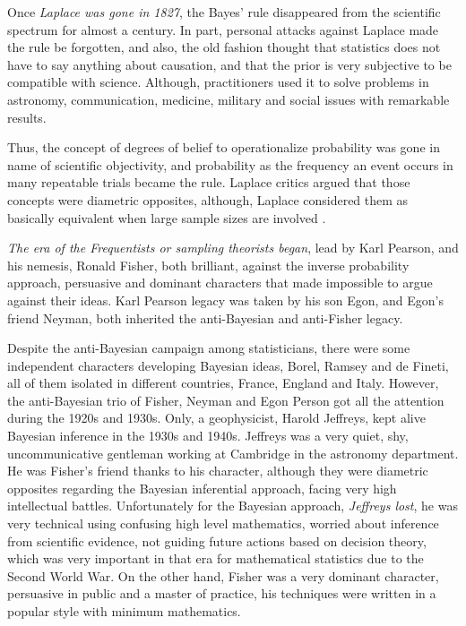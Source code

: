 Once \textit{Laplace was gone in 1827}, the Bayes' rule disappeared from the scientific spectrum for almost a century. In part, personal attacks against Laplace made the rule be forgotten, and also, the old fashion thought that statistics does not have to say anything about causation, and that the prior is very subjective to be compatible with science. Although, practitioners used it to solve problems in astronomy, communication, medicine, military and social issues with remarkable results.

Thus, the concept of degrees of belief to operationalize probability was gone in name of scientific objectivity, and probability as the frequency an event occurs in many repeatable trials became the rule. Laplace critics argued that those concepts were diametric opposites, although, Laplace considered them as basically equivalent when large sample sizes are involved \cite{mcgrayne2011theory}.

\textit{The era of the Frequentists or sampling theorists began}, lead by Karl Pearson, and his nemesis, Ronald Fisher, both brilliant, against the inverse probability approach, persuasive and dominant characters that made impossible to argue against their ideas. Karl Pearson legacy was taken by his son Egon, and Egon's friend Neyman, both inherited the anti-Bayesian and anti-Fisher legacy.  

Despite the anti-Bayesian campaign among statisticians, there were some independent characters developing Bayesian ideas, Borel, Ramsey and de Fineti, all of them isolated in different countries, France, England and Italy. However, the anti-Bayesian trio of Fisher, Neyman and Egon Person got all the attention during the 1920s and 1930s. Only, a geophysicist, Harold Jeffreys, kept alive Bayesian inference in the 1930s and 1940s. Jeffreys was a very quiet, shy, uncommunicative gentleman working at Cambridge in the astronomy department. He was Fisher's friend thanks to his character, although they were diametric opposites regarding the Bayesian inferential approach, facing very high intellectual battles. Unfortunately for the Bayesian approach, \textit{Jeffreys lost}, he was very technical using confusing high level mathematics, worried about inference from scientific evidence, not guiding future actions based on decision theory, which was very important in that era for mathematical statistics due to the Second World War. On the other hand, Fisher was a very dominant character, persuasive in public and a master of practice, his techniques were written in a popular style with minimum mathematics.   
 
